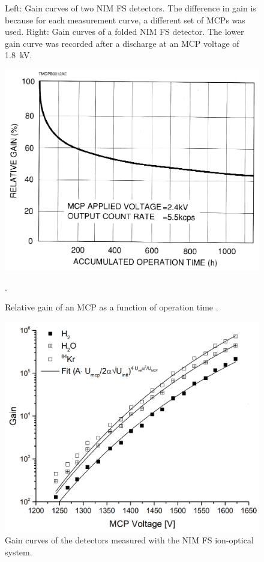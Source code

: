 \begin{figure}[h!]
\begin{subfigure}{.5\textwidth}
	\end{subfigure}
		\caption{Left: Gain curves of two NIM FS detectors. The difference in gain is because for each measurement curve, a different set of MCPs was used. Right: Gain curves of a folded NIM FS detector. The lower gain curve was recorded after a discharge at an MCP voltage of 1.8~kV.}
		\label{fig:SN4p54p7Gain}
	\end{figure}
	\begin{figure}[h] %
		\centering
		\includegraphics[width=.5\textwidth]{Experiments/MCP_relGain_timeevol.png}
		\caption{Relative gain of an MCP as a function of operation time \cite{LecNot_Wurz2017}.}
		\label{fig:MCPrelGainTime}.
	\end{figure}
	\begin{figure}[h!] %
		\centering
		\includegraphics[width=.7\textwidth]{Experiments/GainDetFSLabEl.png}
		\caption{Gain curves of the detectors measured with the NIM FS ion-optical system.}
		\label{fig:MCPGainCurve4p7}
	\end{figure}
